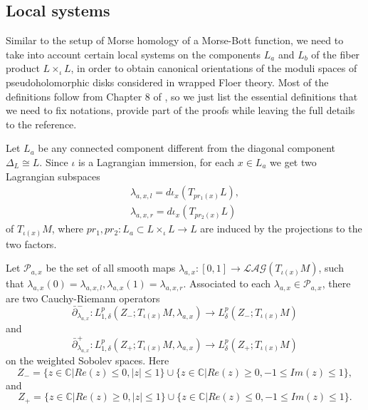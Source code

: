 \documentclass{amsart}
\numberwithin{equation}{section}
\numberwithin{figure}{section}
\begin{document}
\subsection{Local systems}
	Similar to the setup of Morse homology of a Morse-Bott function, we need to take into account certain local systems on the components $L_{a}$ and $L_{b}$ of the fiber product $L \times_{\iota} L$, in order to obtain canonical orientations of the moduli spaces of pseudoholomorphic disks considered in wrapped Floer theory. Most of the definitions follow from Chapter 8 of \cite{FOOO2}, so we just list the essential definitions that we need to fix notations, provide part of the proofs while leaving the full details to the reference. \par
	Let $L_{a}$ be any connected component different from the diagonal component $\Delta_{L} \cong L$. Since $\iota$ is a Lagrangian immersion, for each $x \in L_{a}$ we get two Lagrangian subspaces
\begin{align}\label{the left and right tangent subspaces at a self-intersection}
\lambda_{a, x, l} = d\iota_{x}(T_{pr_{1}(x)}L),\\
\lambda_{a, x, r} = d\iota_{x}(T_{pr_{2}(x)}L)
\end{align}
of $T_{\iota(x)}M$, where $pr_{1}, pr_{2}: L_{a} \subset L \times_{\iota} L \to L$ are induced by the projections to the two factors. \par
	Let $\mathcal{P}_{a, x}$ be the set of all smooth maps $\lambda_{a, x}: [0, 1] \to \mathcal{LAG}(T_{\iota(x)}M)$, such that $\lambda_{a, x}(0) = \lambda_{a, x, l}, \lambda_{a, x}(1) = \lambda_{a, x, r}$. Associated to each $\lambda_{a, x} \in \mathcal{P}_{a, x}$, there are two Cauchy-Riemann operators
\begin{equation}
\bar{\partial}_{\lambda_{a, x}}^{-}: L^{p}_{1, \delta}(Z_{-}; T_{\iota(x)}M, \lambda_{a, x}) \to L^{p}_{\delta}(Z_{-}; T_{\iota(x)}M)
\end{equation}
and
\begin{equation}
\bar{\partial}_{\lambda_{a, x}}^{+}: L^{p}_{1, \delta}(Z_{+}; T_{\iota(x)}M, \lambda_{a, x}) \to L^{p}_{\delta}(Z_{+}; T_{\iota(x)}M)
\end{equation}
on the weighted Sobolev spaces. Here
\begin{equation}
Z_{-} = \{z \in \mathbb{C}| Re(z) \le 0, |z| \le 1\} \cup \{z \in \mathbb{C}| Re(z) \ge 0, -1 \le Im(z) \le 1\},
\end{equation}
and
\begin{equation}
Z_{+} = \{z \in \mathbb{C}| Re(z) \ge 0, |z| \le 1\} \cup \{z \in \mathbb{C}| Re(z) \le 0, -1 \le Im(z) \le 1\}.
\end{equation}
\end{document}
